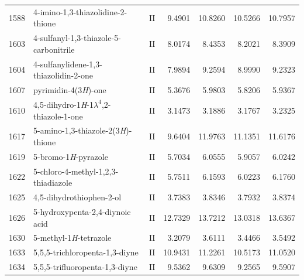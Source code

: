 \begin{longtable}{rlcd{2.5}d{2.5}d{2.5}d{2.5}}
    1588 & 4-imino-1,3-thiazolidine-2-thione                      & II & 9.4901  & 10.8260 & 10.5266 & 10.7957 \\
    1603 & 4-sulfanyl-1,3-thiazole-5-carbonitrile                 & II & 8.0174  & 8.4353  & 8.2021  & 8.3909  \\
    1604 & 4-sulfanylidene-1,3-thiazolidin-2-one                  & II & 7.9894  & 9.2594  & 8.9990  & 9.2323  \\
    1607 & pyrimidin-4(3\textit{H})-one                           & II & 5.3676  & 5.9803  & 5.8206  & 5.9367  \\
    1610 & 4,5-dihydro-1\textit{H}-1$\lambda^4$,2-thiazole-1-one  & II & 3.1473  & 3.1886  & 3.1767  & 3.2325  \\
    1617 & 5-amino-1,3-thiazole-2(3\textit{H})-thione             & II & 9.6404  & 11.9763 & 11.1351 & 11.6176 \\
    1619 & 5-bromo-1\textit{H}-pyrazole                           & II & 5.7034  & 6.0555  & 5.9057  & 6.0242  \\
    1622 & 5-chloro-4-methyl-1,2,3-thiadiazole                    & II & 5.7511  & 6.1593  & 6.0223  & 6.1760  \\
    1625 & 4,5-dihydrothiophen-2-ol                               & II & 3.7383  & 3.8346  & 3.7932  & 3.8374  \\
    1626 & 5-hydroxypenta-2,4-diynoic   acid                      & II & 12.7329 & 13.7212 & 13.0318 & 13.6367 \\
    1630 & 5-methyl-1\textit{H}-tetrazole                         & II & 3.2079  & 3.6111  & 3.4466  & 3.5492  \\
    1633 & 5,5,5-trichloropenta-1,3-diyne                         & II & 10.9431 & 11.2261 & 10.5173 & 11.0520 \\
    1634 & 5,5,5-trifluoropenta-1,3-diyne                         & II & 9.5362  & 9.6309  & 9.2565  & 9.5907 
\end{longtable}

\endgroup
